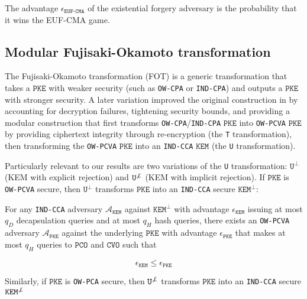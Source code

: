 \documentclass[floatrow,journal=tches,submission]{iacrtrans}
\newcommand{\monospace}{\texttt}
\newcommand{\pke}{\monospace{PKE}}
\newcommand{\kem}{\monospace{KEM}}
\newcommand{\pco}{\monospace{PCO}}
\newcommand{\cvo}{\monospace{CVO}}
\begin{document}
The advantage $\epsilon_\monospace{EUF-CMA}$ of the existential forgery adversary is the probability that it wins the EUF-CMA game.

\subsection{Modular Fujisaki-Okamoto transformation}
The Fujisaki-Okamoto transformation (FOT) \cite{fujisaki1999secure} is a generic transformation that takes a $\pke$ with weaker security (such as \monospace{OW-CPA} or \monospace{IND-CPA}) and outputs a $\pke$ with stronger security. A later variation \cite{hofheinz2017modular} improved the original construction in \cite{fujisaki1999secure} by accounting for decryption failures, tightening security bounds, and providing a modular construction that first transforms \monospace{OW-CPA}/\monospace{IND-CPA} $\pke$ into \monospace{OW-PCVA} $\pke$ by providing ciphertext integrity through re-encryption (the \monospace{T} transformation), then transforming the \monospace{OW-PCVA} $\pke$ into an \monospace{IND-CCA} $\kem$ (the \monospace{U} transformation).


Particularly relevant to our results are two variations of the \monospace{U} transformation: $\monospace{U}^\bot$ (KEM with explicit rejection) and $\monospace{U}^{\not\bot}$ (KEM with implicit rejection). If $\pke$ is \monospace{OW-PCVA} secure, then $\monospace{U}^\bot$ transforms $\pke$ into an \monospace{IND-CCA} secure $\kem^\bot$:

\begin{theorem}\label{thm:u-bot}
    For any \monospace{IND-CCA} adversary $\mathcal{A}_\kem$ against $\kem^\bot$ with advantage $\epsilon_\kem$ issuing at most $q_D$ decapsulation queries and at most $q_H$ hash queries, there exists an \monospace{OW-PCVA} adversary $\mathcal{A}_\pke$ against the underlying $\pke$ with advantage $\epsilon_\pke$ that makes at most $q_H$ queries to $\pco$ and $\cvo$ such that

    \begin{equation*}
        \epsilon_\kem \leq \epsilon_\pke
    \end{equation*}
\end{theorem}

Similarly, if $\pke$ is \monospace{OW-PCA} secure, then $\monospace{U}^{\not\bot}$ transforms $\pke$ into an \monospace{IND-CCA} secure $\kem^{\not\bot}$
\end{document}
